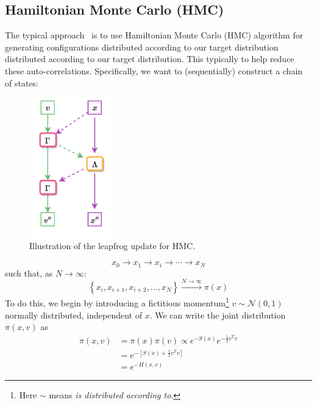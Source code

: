 \documentclass[a4paper,11pt]{article}
\begin{document}
\subsection{\label{subsec:hmc}Hamiltonian Monte Carlo (HMC)}
%
The typical approach~\cite{HMC} is to use Hamiltonian Monte Carlo (HMC)
algorithm for generating configurations distributed according to our
target distribution 
distributed according to our target
distribution.
%
This typically 
to help
reduce these auto-correlations.
%
Specifically, we want to (sequentially) construct a chain of states:
%
\begin{figure}
  \begin{center}
  \includegraphics[width=0.33\textwidth]{assets/hmc-update7.pdf}
  \end{center}
    \caption{\label{fig:hmc-update}Illustration of the leapfrog update for HMC.}
\end{figure}
%
\begin{equation}
x_{0} \rightarrow x_{1} \rightarrow x_{i} \rightarrow \cdots \rightarrow x_{N}
\end{equation}
%
such that, as $N \rightarrow \infty$:
%
\begin{equation}
\left\{x_{i}, x_{i+1}, x_{i+2}, \ldots, x_{N}\right\} \xrightarrow[]{N\rightarrow\infty} \pi(x)
\end{equation}
%
To do this, we begin by introducing a fictitious momentum\footnote{Here $\sim$ means \textit{is distributed according to}.} $v \sim \mathcal{N}(0, 1)$ normally distributed, independent of $x$.
%
We can write the joint distribution $\pi(x, v)$ as
%
\begin{align}
\pi(x, v) &= \pi(x) \pi(v) \propto e^{-S(x)} e^{-\frac{1}{2} v^{T}v} \\
&= e^{-\left[S(x) + \frac{1}{2} v^{T} v \right]} \\
&= e^{-H(x, v)}
\end{align}
\end{document}
